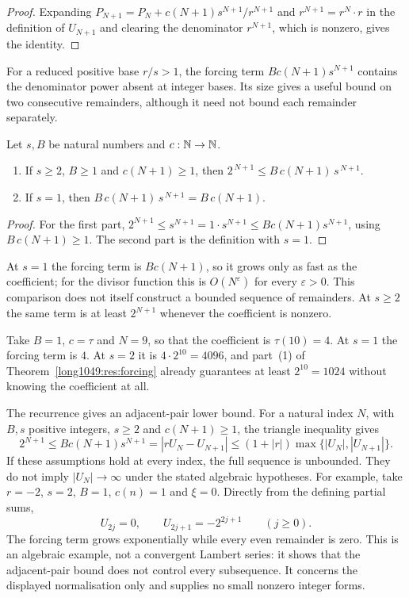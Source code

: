 \documentclass[11pt]{article}
\begin{document}
\begin{proof}
Expanding
$P_{N+1}=P_N+c(N+1)s^{N+1}/r^{N+1}$ and $r^{N+1}=r^{N}\cdot r$ in the
definition of $U_{N+1}$ and clearing the denominator $r^{N+1}$, which is
nonzero, gives the identity.
\end{proof}

For a reduced positive base $r/s>1$, the forcing term
$Bc(N+1)s^{N+1}$ contains the denominator power absent at integer
bases. Its size gives a useful bound on two consecutive remainders,
although it need not bound each remainder separately.

\begin{theorem}\label{long1049:res:forcing}
Let $s,B$ be natural numbers and $c:\mathbb{N}\to\mathbb{N}$.
\begin{enumerate}
\item If $s\ge2$, $B\ge1$ and $c(N+1)\ge1$, then
$2^{\,N+1}\le B\,c(N+1)\,s^{\,N+1}$.
\item If $s=1$, then $B\,c(N+1)\,s^{\,N+1}=B\,c(N+1)$.
\end{enumerate}
\end{theorem}

\begin{proof}
For the first part,
$2^{N+1}\le s^{N+1}=1\cdot s^{N+1}\le Bc(N+1)s^{N+1}$,
using $B\,c(N+1)\ge1$.  The second part is the definition with $s=1$.
\end{proof}

At $s=1$ the forcing term is $Bc(N+1)$, so it grows only as fast as the
coefficient; for the divisor function this is $O(N^{\varepsilon})$ for every
$\varepsilon>0$. This comparison does not itself construct a bounded
sequence of remainders.  At $s\ge2$ the same
term is at least $2^{N+1}$ whenever the coefficient is nonzero.

\begin{example}\label{long1049:ex:forcing}
Take $B=1$, $c=\tau$ and $N=9$, so that the coefficient is $\tau(10)=4$.  At
$s=1$ the forcing term is $4$.  At $s=2$ it is $4\cdot2^{10}=4096$, and part~(1)
of Theorem~\ref{long1049:res:forcing} already guarantees at least $2^{10}=1024$ without
knowing the coefficient at all.
\end{example}

The recurrence gives an adjacent-pair lower bound. For a natural index
$N$, with $B,s$ positive integers, $s\ge2$ and $c(N+1)\ge1$, the
triangle inequality gives
\[
 2^{N+1}\le Bc(N+1)s^{N+1}
 =|rU_N-U_{N+1}|
 \le(1+|r|)\max\{|U_N|,|U_{N+1}|\}.
\]
If these assumptions hold at every index, the full sequence is unbounded.
They do not imply $|U_N|\to\infty$ under the stated algebraic hypotheses. For example, take $r=-2$, $s=2$,
$B=1$, $c(n)=1$ and $\xi=0$. Directly from the defining partial sums,
\[
 U_{2j}=0,\qquad U_{2j+1}=-2^{2j+1}\qquad(j\ge0).
\]
The forcing term grows exponentially while every even remainder is
zero. This is an algebraic example, not a convergent Lambert series: it
shows that the adjacent-pair bound does not control every subsequence.
It concerns the displayed normalisation only and supplies no small
nonzero integer forms.
\end{document}
